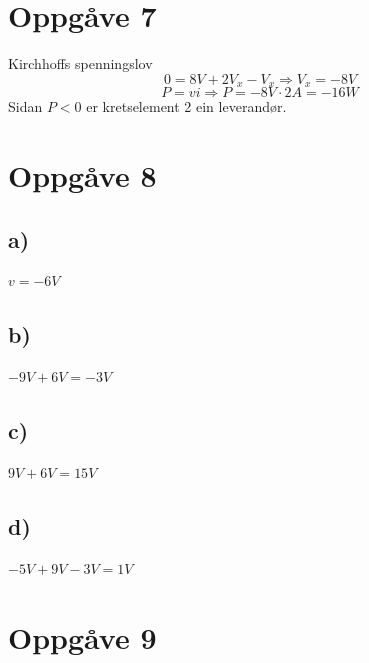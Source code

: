 \documentclass[12pt,a4paper]{article}
\begin{document}
	\newpage

	\section{Oppgåve 7}
		Kirchhoffs spenningslov
		\begin{equation}
			0 = 8V + 2V_{x} -V_{x}	\Rightarrow V_{x}=-8V
		\end{equation}
		\begin{equation}
			P = vi \Rightarrow P = -8V\cdot 2A = -16W	
		\end{equation}
		Sidan $P < 0$ er kretselement 2 ein leverandør.

	\section{Oppgåve 8}
		\subsection{a)}
		$v=-6V$

		\subsection{b)}
		$-9V+6V=-3V$

		\subsection{c)}
		$9V+6V=15V$

		\subsection{d)}
		$-5V+9V-3V=1V$
	
	\newpage

	\section{Oppgåve 9}
\end{document}
